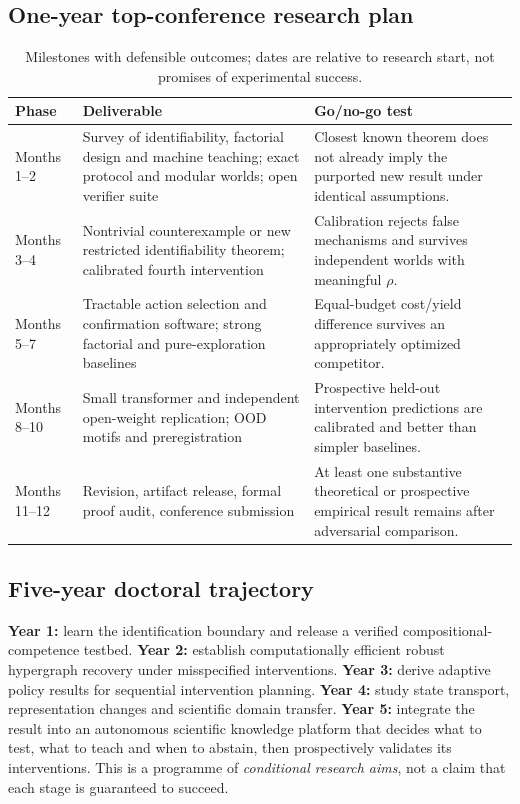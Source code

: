 \documentclass[11pt,a4paper]{article}
\theoremstyle{definition}\newtheorem{definition}[theorem]{Definition}
\theoremstyle{remark}\newtheorem{remark}[theorem]{Remark}
\begin{document}
\subsection{One-year top-conference research plan}
\begin{table}[htbp]\centering\footnotesize
\caption{Milestones with defensible outcomes; dates are relative to research start, not promises of experimental success.}\label{tab:milestones}
\begin{tabularx}{\linewidth}{@{}p{.12\linewidth}Y Y@{}}\toprule
Phase&Deliverable&Go/no-go test\\\midrule
Months 1--2&Survey of identifiability, factorial design and machine teaching; exact protocol and modular worlds; open verifier suite&Closest known theorem does not already imply the purported new result under identical assumptions.\\
Months 3--4&Nontrivial counterexample or new restricted identifiability theorem; calibrated fourth intervention&Calibration rejects false mechanisms and survives independent worlds with meaningful $\rho$.\\
Months 5--7&Tractable action selection and confirmation software; strong factorial and pure-exploration baselines&Equal-budget cost/yield difference survives an appropriately optimized competitor.\\
Months 8--10&Small transformer and independent open-weight replication; OOD motifs and preregistration&Prospective held-out intervention predictions are calibrated and better than simpler baselines.\\
Months 11--12&Revision, artifact release, formal proof audit, conference submission&At least one substantive theoretical or prospective empirical result remains after adversarial comparison.\\\bottomrule
\end{tabularx}
\end{table}

\subsection{Five-year doctoral trajectory}
\textbf{Year 1:} learn the identification boundary and release a verified compositional-competence testbed. \textbf{Year 2:} establish computationally efficient robust hypergraph recovery under misspecified interventions. \textbf{Year 3:} derive adaptive policy results for sequential intervention planning. \textbf{Year 4:} study state transport, representation changes and scientific domain transfer. \textbf{Year 5:} integrate the result into an autonomous scientific knowledge platform that decides what to test, what to teach and when to abstain, then prospectively validates its interventions. This is a programme of \emph{conditional research aims}, not a claim that each stage is guaranteed to succeed.
\end{document}
